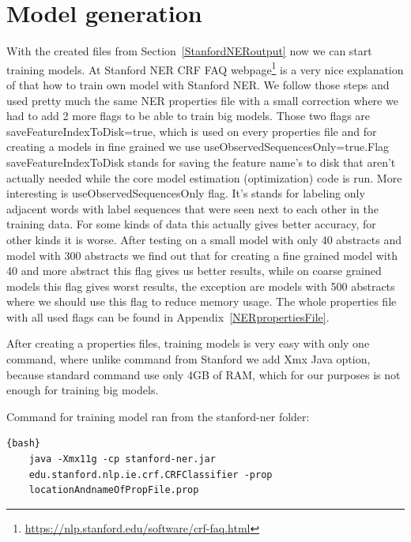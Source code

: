 \documentclass[thesis=M,english]{FITthesis}[2018/05/30]
\begin{document}
\section{Model generation}\label{modelGeneration}
	With the created files from Section~\ref{StanfordNERoutput} now we can start training models. At Stanford NER CRF FAQ webpage\footnote{\url{https://nlp.stanford.edu/software/crf-faq.html}} is a very nice explanation of that how to train own model with Stanford NER. We follow those steps and used pretty much the same NER properties file with a small correction where we had to add 2 more flags to be able to train big models. Those two flags are saveFeatureIndexToDisk=true, which is used on every properties file and for creating a models in fine grained we use useObservedSequencesOnly=true.Flag saveFeatureIndexToDisk stands for saving the feature name's to disk that aren't actually needed while the core model estimation (optimization) code is run. More interesting is useObservedSequencesOnly flag. It's stands for labeling only adjacent words with label sequences that were seen next to each other in the training data. For some kinds of data this actually gives better accuracy, for other kinds it is worse. After testing on a small model with only 40 abstracts and model with 300 abstracts we find out that for creating a fine grained model with 40 and more abstract this flag gives us better results, while on coarse grained models this flag gives worst results, the exception are models with 500 abstracts where we should use this flag to reduce memory usage. The whole properties file with all used flags can be found in Appendix~\ref{NERpropertiesFile}.  
 
 After creating a properties files, training models is very easy with only one command, where unlike command from Stanford we add Xmx Java option, because standard command use only 4GB of RAM, which for our purposes is not enough for training big models. 
 
 Command for training model ran from the stanford-ner folder:
 \begin{lstlisting}{bash}
 	java -Xmx11g -cp stanford-ner.jar 
 	edu.stanford.nlp.ie.crf.CRFClassifier -prop 
 	locationAndnameOfPropFile.prop
 \end{lstlisting}
	
\end{document}
